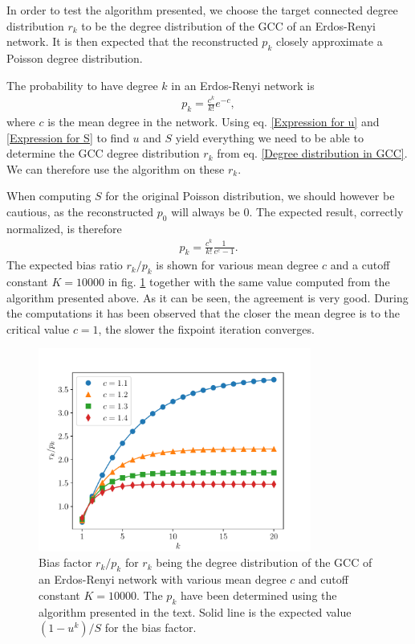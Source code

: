 \documentclass[
11pt, %
english, %
singlespacing, %
liststotoc, %
headsepline, %
]{MastersDoctoralThesis} %
\begin{document}
In order to test the algorithm presented, we choose the target connected degree distribution $r_k$ to be the degree distribution of the GCC of an Erdos-Renyi network. It is then expected that the reconstructed $p_k$ closely approximate a Poisson degree distribution.

The probability to have degree $k$ in an Erdos-Renyi network is
\begin{align}
	p_k = \frac{c^k}{k!} e^{-c},
\end{align}
where $c$ is the mean degree in the network. Using eq. \eqref{Expression for u} and \eqref{Expression for S} to find $u$ and $S$ yield everything we need to be able to determine the GCC degree distribution $r_k$ from eq. \eqref{Degree distribution in GCC}. We can therefore use the algorithm on these $r_k$.

When computing $S$ for the original Poisson distribution, we should however be cautious, as the reconstructed $p_0$ will always be $0$. The expected result, correctly normalized, is therefore
\begin{align}
	p_k = \frac{c^k}{k!} \frac{1}{e^{c} - 1}.
\end{align}
The expected bias ratio $r_k/p_k$ is shown for various mean degree $c$ and a cutoff constant $K = 10000$ in fig. \ref{Figure: Erdos-Renyi reconstruction} together with the same value computed from the algorithm presented above. As it can be seen, the agreement is very good. During the computations it has been observed that the closer the mean degree is to the critical value $c = 1$, the slower the fixpoint iteration converges.

\begin{figure}
	\includegraphics[width=0.8\textwidth]{ER_reconstruction.pdf}
	\caption{Bias factor $r_k/p_k$ for $r_k$ being the degree distribution of the GCC of an Erdos-Renyi network with various mean degree $c$ and cutoff constant $K = 10000$. The $p_k$ have been determined using the algorithm presented in the text. Solid line is the expected value $(1 - u^k)/S$ for the bias factor.}
	\label{Figure: Erdos-Renyi reconstruction}
\end{figure}
\end{document}
